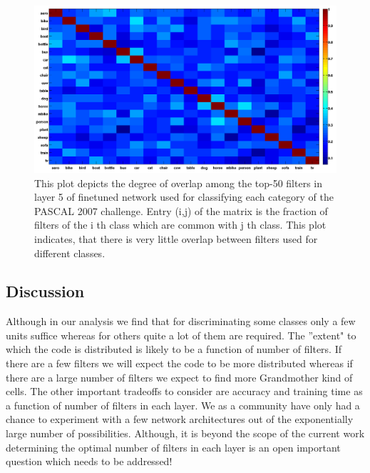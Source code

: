 \documentclass[runningheads]{llncs}
\begin{document}
\begin{figure}[t!]
\centering
\includegraphics[width=1.0\linewidth]{images/ftNet_commonfilters.png}
\caption{This plot depicts the degree of overlap among the top-50 filters in layer 5 of
finetuned network used for classifying each category of the PASCAL 2007 challenge. Entry
(i,j) of the matrix is the fraction of filters of the i th class which are common with j th class. This plot indicates, that there is very little overlap between filters used for different classes.}
\label{fig:svm-sel-dims}
\end{figure}







\subsection{Discussion}
Although in our analysis we find that for discriminating some classes only a few units suffice whereas for others quite a lot of them are required. The ''extent" to which the code is distributed is likely to be a function of number of filters. If there are a few filters we will expect the code to be more distributed whereas if there are a large number of filters we expect to find more Grandmother kind of cells. The other important tradeoffs to consider are accuracy and training time as a function of number of filters in each layer. We as a community have only had a chance to experiment with a few network architectures out of the exponentially large number of possibilities. Although, it is beyond the scope of the current work determining the optimal number of filters in each layer is an open important question which needs to be addressed! 
\end{document}
